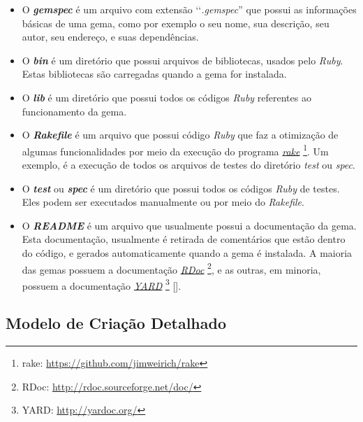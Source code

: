 \begin{itemize}

 \item O \emph{\textbf{gemspec}} é um arquivo com extensão ‘‘\emph{.gemspec}'' que possui as informações básicas
 de uma gema, como por exemplo o seu nome, sua descrição, seu autor, seu endereço, e suas dependências.

 \item O \emph{\textbf{bin}} é um diretório que possui arquivos de bibliotecas, usados pelo \emph{Ruby}.
 Estas bibliotecas são carregadas quando a gema for instalada.

 \item O \emph{\textbf{lib}} é um diretório que possui todos os códigos \emph{Ruby} referentes ao
 funcionamento da gema.

 \item O \emph{\textbf{Rakefile}} é um arquivo que possui código \emph{Ruby} que faz a otimização de algumas
 funcionalidades por meio da execução do programa \emph{\href{https://github.com/jimweirich/rake}{rake}}
 \footnote{rake: \url{https://github.com/jimweirich/rake}}. Um exemplo, é a execução de todos os arquivos
 de testes do diretório \emph{test} ou \emph{spec}.

 \item O \emph{\textbf{test}} ou \emph{\textbf{spec}} é um diretório que possui todos os códigos \emph{Ruby}
 de testes. Eles podem ser executados manualmente ou por meio do \emph{Rakefile}.

 \item O \emph{\textbf{README}} é um arquivo que usualmente possui a documentação da gema. Esta
 documentação, usualmente é retirada de comentários que estão dentro do código, e gerados automaticamente
 quando a gema é instalada. A maioria das gemas possuem a documentação
 \emph{\href{http://rdoc.sourceforge.net/doc/}{RDoc}} \footnote{RDoc: \url{http://rdoc.sourceforge.net/doc/}},
 e as outras, em minoria, possuem a documentação \emph{\href{http://yardoc.org/}{YARD}}
 \footnote{YARD: \url{http://yardoc.org/}} [].

\end{itemize}


\subsection{Modelo de Criação Detalhado}
\label{subsection:modelo_de_criação_detalhado}


